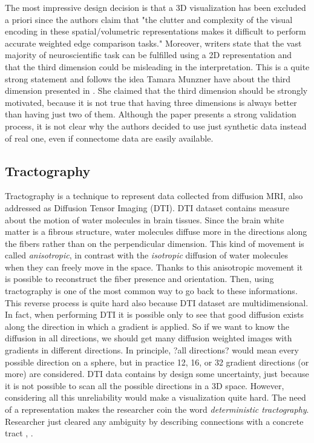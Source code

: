 \documentclass{article}
\begin{document}
\begin{multicols}{2}
The most impressive design decision is that a 3D visualization has been excluded a priori since the authors claim that "the clutter and complexity of the visual encoding in these spatial/volumetric representations makes it difficult to perform accurate weighted edge comparison tasks." Moreover, writers state that the vast majority of neuroscientific task can be fulfilled using a 2D representation and that the third dimension could be misleading in the interpretation. This is a quite strong statement and follows the idea Tamara Munzner have about the third dimension presented in \cite{processAndPitfalls}. She claimed that the third dimension should be strongly motivated, because it is not true that having three dimensions is always better than having just two of them. Although the paper presents a strong validation process, it is not clear why the authors decided to use just synthetic data instead of real one, even if connectome data are easily available.

\subsection{Tractography}
Tractography is a technique to represent data collected from diffusion MRI, also addressed as Diffusion Tensor Imaging (DTI). DTI dataset contains measure about the motion of water molecules in brain tissues. Since the brain white matter is a fibrous structure, water molecules diffuse more in the directions along the fibers rather than on the perpendicular dimension. This kind of movement is called \textit{anisotropic}, in contrast with the \textit{isotropic} diffusion of water molecules when they can freely move in the space. Thanks to this anisotropic movement it is possible to reconstruct the fiber presence and orientation. Then, using tractography is one of the most common way to go back to these informations. This reverse process is quite hard also because DTI dataset are multidimensional. In fact, when performing DTI it is possible only to see that good diffusion exists along the direction in which a gradient is applied. So if we want to know the diffusion in all directions, we should get many diffusion weighted images with gradients in different directions. In principle, ?all directions? would mean every possible direction on a sphere, but in practice 12, 16, or 32 gradient directions (or more) are considered. DTI data contains by design some uncertainty, just because it is not possible to scan all the possible directions in a 3D space. However, considering all this unreliability would make a visualization quite hard. The need of a representation makes the researcher coin the word \textit{deterministic tractography}. Researcher just cleared any ambiguity by describing connections with a concrete tract \cite{conturo1999tracking}, \cite{mori1999three}. 


\end{multicols}
\end{document}
